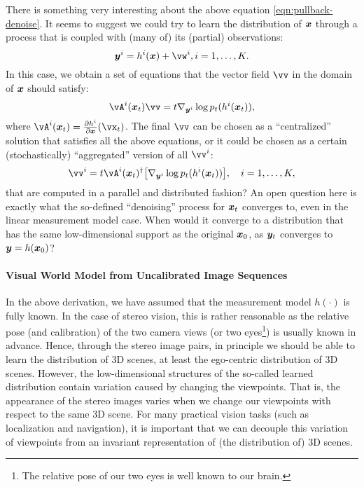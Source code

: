 \documentclass[../../book-main.tex]{subfiles}
\begin{document}
\begin{remark}
{There is something very interesting about the above equation \eqref{eqn:pullback-denoise}. It seems to suggest we could try to learn the distribution of $\bm{x}$ through a process that is coupled with (many of) its (partial) observations:
\begin{equation}
\y^i = h^i(\x) +\vw^i, i =1, \ldots, K.
\end{equation} In this case, we obtain a set of equations that the vector field $\vv$ in the domain of $\bm{x}$ should satisfy:
\begin{equation}
    \vA^i(\x_t) \vv = t \nabla_{\y^i} \log p_t(h^i(\x_t)),
\label{eqn:federated-pushforward}
\end{equation}
where $\vA^i(\x_t) = \frac{\partial h^i}{\partial \x}(\vx_t)$. The final $\vv$ can be chosen as a ``centralized'' solution that satisfies all the above equations, or it could be chosen as a certain (stochastically) ``aggregated'' version of all $\vv^i$:
\begin{equation}
    \vv^i = t\vA^i(\x_t)^\dagger \big[\nabla_{\y^i} \log p_t(h^i(\x_t))\big], \quad i = 1, \ldots, K,
\end{equation}
that are computed in a parallel and distributed fashion? An open question here is exactly what the so-defined ``denoising'' process for $\bm{x}_t$ converges to, even in the linear measurement model case. When would it converge to a distribution that has the same low-dimensional support as the original $\bm{x}_0$, as $\bm{y}_t$ converges to $\bm{y} = h(\bm{x}_0)$? }
\end{remark}



\paragraph{Visual World Model from Uncalibrated Image Sequences}

In the above derivation, we have assumed that the measurement model $h(\cdot)$ is fully known. In the case of stereo vision, this is rather reasonable as the relative pose (and calibration) of the two camera views (or two eyes\footnote{The relative pose of our two eyes is well known to our brain.}) is usually known in advance. Hence, through the stereo image pairs, in principle we should be able to learn the distribution of 3D scenes, at least the ego-centric distribution of 3D scenes. However, the low-dimensional structures of the so-called learned distribution contain variation caused by changing the viewpoints. That is, the appearance of the stereo images varies when we change our viewpoints with respect to the same 3D scene. For many practical vision tasks (such as localization and navigation), it is important that we can decouple this variation of viewpoints from an invariant representation of (the distribution of) 3D scenes.
\end{document}
